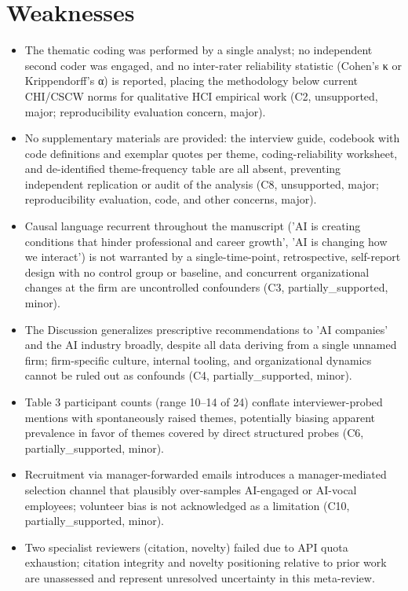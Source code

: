 \documentclass[11pt]{article}
\begin{document}
\section*{Weaknesses}
\begin{itemize}[leftmargin=*]
  \item The thematic coding was performed by a single analyst; no independent second coder was engaged, and no inter-rater reliability statistic (Cohen's κ or Krippendorff's α) is reported, placing the methodology below current CHI/CSCW norms for qualitative HCI empirical work (C2, unsupported, major; reproducibility evaluation concern, major).
  \item No supplementary materials are provided: the interview guide, codebook with code definitions and exemplar quotes per theme, coding-reliability worksheet, and de-identified theme-frequency table are all absent, preventing independent replication or audit of the analysis (C8, unsupported, major; reproducibility evaluation, code, and other concerns, major).
  \item Causal language recurrent throughout the manuscript ('AI is creating conditions that hinder professional and career growth', 'AI is changing how we interact') is not warranted by a single-time-point, retrospective, self-report design with no control group or baseline, and concurrent organizational changes at the firm are uncontrolled confounders (C3, partially\_supported, minor).
  \item The Discussion generalizes prescriptive recommendations to 'AI companies' and the AI industry broadly, despite all data deriving from a single unnamed firm; firm-specific culture, internal tooling, and organizational dynamics cannot be ruled out as confounds (C4, partially\_supported, minor).
  \item Table 3 participant counts (range 10–14 of 24) conflate interviewer-probed mentions with spontaneously raised themes, potentially biasing apparent prevalence in favor of themes covered by direct structured probes (C6, partially\_supported, minor).
  \item Recruitment via manager-forwarded emails introduces a manager-mediated selection channel that plausibly over-samples AI-engaged or AI-vocal employees; volunteer bias is not acknowledged as a limitation (C10, partially\_supported, minor).
  \item Two specialist reviewers (citation, novelty) failed due to API quota exhaustion; citation integrity and novelty positioning relative to prior work are unassessed and represent unresolved uncertainty in this meta-review.
\end{itemize}
\end{document}
